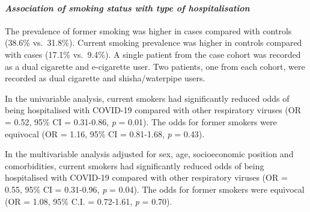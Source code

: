 \documentclass[
]{article}
\begin{document}
\hypertarget{association-of-smoking-status-with-type-of-hospitalisation}{%
\paragraph{\texorpdfstring{\emph{Association of smoking status with type
of hospitalisation
}}{Association of smoking status with type of hospitalisation }}\label{association-of-smoking-status-with-type-of-hospitalisation}}

The prevalence of former smoking was higher in cases compared with
controls (38.6\% vs.~31.8\%). Current smoking prevalence was higher in
controls compared with cases (17.1\% vs.~9.4\%). A single patient from
the case cohort was recorded as a dual cigarette and e-cigarette user.
Two patients, one from each cohort, were recorded as dual cigarette and
shisha/waterpipe users.

In the univariable analysis, current smokers had significantly reduced
odds of being hospitalised with COVID-19 compared with other respiratory
viruses (OR = 0.52, 95\% CI = 0.31-0.86, \emph{p} = 0.01). The odds for
former smokers were equivocal (OR = 1.16, 95\% CI = 0.81-1.68, \emph{p}
= 0.43).

In the multivariable analysis adjusted for sex, age, socioeconomic
position and comorbidities, current smokers had significantly reduced
odds of being hospitalised with COVID-19 compared with other respiratory
viruses (OR = 0.55, 95\% CI = 0.31-0.96, \emph{p} = 0.04). The odds for
former smokers were equivocal (OR = 1.08, 95\% C.I. = 0.72-1.61,
\emph{p} = 0.70).
\end{document}
